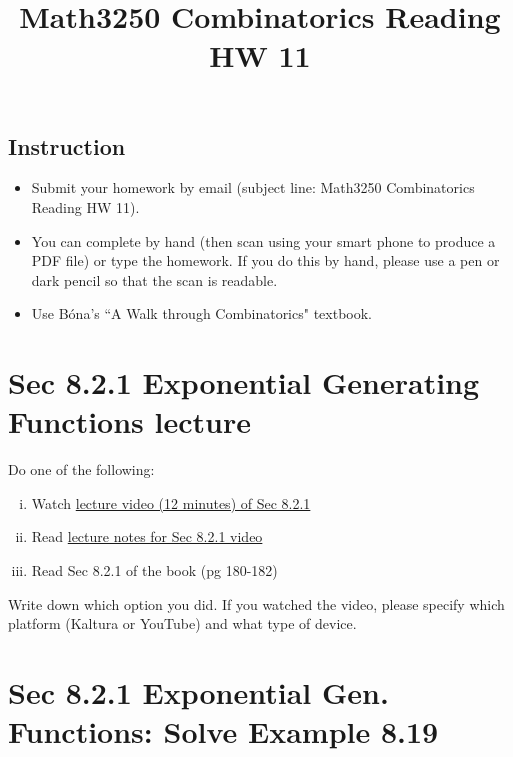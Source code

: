 \documentclass[12pt]{amsart}
\title{Math3250 Combinatorics Reading HW 11}
\begin{document}
\maketitle



\subsection*{Instruction}

\begin{itemize}
\item 
Submit your homework by email (subject line: Math3250 Combinatorics Reading HW 11). 
\item 
You can complete by hand (then scan using your smart phone to produce a PDF file) or type the homework. If you do this by hand, please use a pen or dark pencil so that the scan is readable.
\item
Use B\'ona's ``A Walk through Combinatorics" textbook.
\end{itemize}

\bigskip



\section{Sec 8.2.1 Exponential Generating Functions lecture}
Do one of the following:
\begin{enumerate}[i.]
		\item Watch \href{}{lecture video (12 minutes) of Sec 8.2.1}
	\item Read  \href{https://egunawan.github.io/combinatorics/notes/notes8_2_1recurrence_relations_and_exponential_generating_functions.pdf}{lecture notes for Sec 8.2.1 video}
	\item Read Sec 8.2.1 of the book (pg 180-182)
\end{enumerate}

Write down which option you did. If you watched the video, please specify which platform (Kaltura or YouTube) and what type of device.

\section{Sec 8.2.1 Exponential Gen. Functions: Solve Example 8.19}
\end{document}

